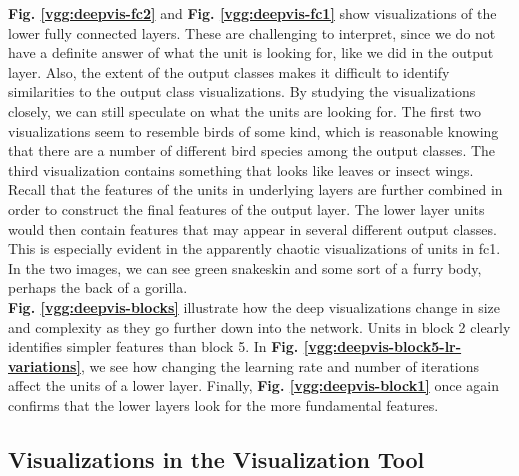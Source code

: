 \noindent \textbf{Fig. \ref{vgg:deepvis-fc2}} and \textbf{Fig. \ref{vgg:deepvis-fc1}} show visualizations of the lower fully connected layers. These are challenging to interpret, since we do not have a definite answer of what the unit is looking for, like we did in the output layer. Also,  the extent of the output classes makes it difficult to identify similarities to the output class visualizations. By studying the visualizations closely, we can still speculate on what the units are looking for. The first two visualizations seem to resemble birds of some kind, which is reasonable knowing that there are a number of different bird species among the output classes. The third visualization contains something that looks like leaves or insect wings. Recall that the features of the units in underlying layers are further combined in order to construct the final features of the output layer. The lower layer units would then contain features that may appear in several different output classes. This is especially evident in the apparently chaotic visualizations of units in fc1. In the two images, we can see green snakeskin and some sort of a furry body, perhaps the back of a gorilla. \\ %

\noindent \textbf{Fig. \ref{vgg:deepvis-blocks}} illustrate how the deep visualizations change in size and complexity as they go further down into the network. Units in block 2 clearly identifies simpler features than block 5. In \textbf{Fig. \ref{vgg:deepvis-block5-lr-variations}}, we see how changing the learning rate and number of iterations affect the units of a lower layer. %
Finally, \textbf{Fig. \ref{vgg:deepvis-block1}} once again confirms that the lower layers look for the more fundamental features. %

\subsection{Visualizations in the Visualization Tool}

